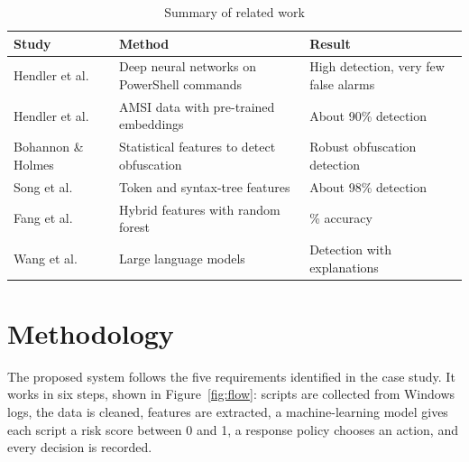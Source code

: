 \documentclass[12pt,a4paper]{article}
\begin{document}
\begin{table}[htbp]
\centering
\caption{Summary of related work}\label{tab:lit}
\begin{tabularx}{\textwidth}{>{\raggedright\arraybackslash}p{3.3cm} >{\raggedright\arraybackslash}X >{\raggedright\arraybackslash}p{4.3cm}}
\toprule
\textbf{Study} & \textbf{Method} & \textbf{Result}\\
\midrule
Hendler et al.~\cite{hendler2018} & Deep neural networks on PowerShell commands & High detection, very few false alarms\\
Hendler et al.~\cite{hendler2020} & AMSI data with pre-trained embeddings & About 90\% detection\\
Bohannon \& Holmes~\cite{bohannon2017} & Statistical features to detect obfuscation & Robust obfuscation detection\\
Song et al.~\cite{song2021} & Token and syntax-tree features & About 98\% detection\\
Fang et al.~\cite{fang2021} & Hybrid features with random forest & 98.93\% accuracy\\
Wang et al.~\cite{wang2026} & Large language models & Detection with explanations\\
\bottomrule
\end{tabularx}
\end{table}

\section{Methodology}
The proposed system follows the five requirements identified in the case study. It works in six steps, shown in Figure~\ref{fig:flow}: scripts are collected from Windows logs, the data is cleaned, features are extracted, a machine-learning model gives each script a risk score between 0 and 1, a response policy chooses an action, and every decision is recorded.
\end{document}
